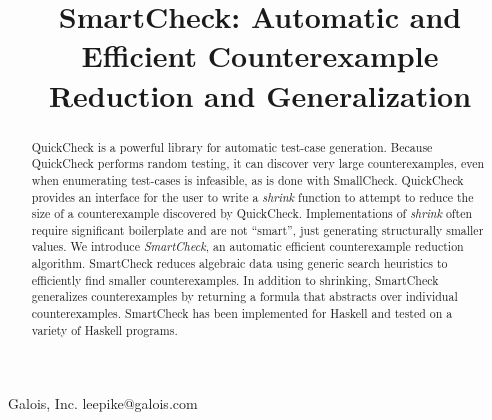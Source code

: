 \documentclass[10pt]{sigplanconf}
\begin{document}


\title{SmartCheck: Automatic and Efficient Counterexample Reduction and Generalization}

           {Galois, Inc.}
           {leepike@galois.com}
\maketitle

\begin{abstract}
QuickCheck is a powerful library for automatic test-case generation.  Because
QuickCheck performs random testing, it can discover very large counterexamples,
even when enumerating test-cases is infeasible, as is done with SmallCheck.
QuickCheck provides an interface for the user to write a \emph{shrink} function
to attempt to reduce the size of a counterexample discovered by QuickCheck.
Implementations of \emph{shrink} often require significant boilerplate and are
not ``smart'', just generating structurally smaller values.  We introduce
\emph{SmartCheck}, an automatic efficient counterexample reduction algorithm.
SmartCheck reduces algebraic data using generic search heuristics to efficiently
find smaller counterexamples.  In addition to shrinking, SmartCheck generalizes
counterexamples by returning a formula that abstracts over individual
counterexamples.  SmartCheck has been implemented for Haskell and tested on a
variety of Haskell programs.
\end{abstract}





\end{document}
